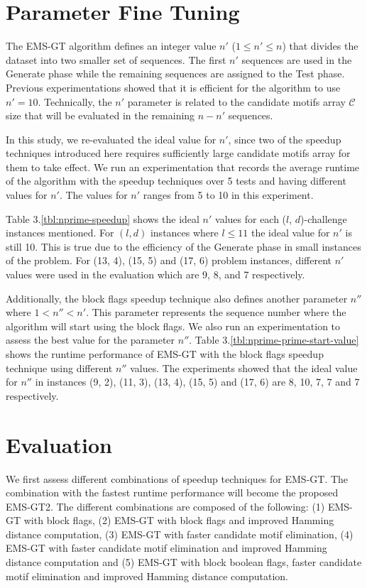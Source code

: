 
\section{Parameter Fine Tuning}
The EMS-GT algorithm defines an integer value $n'$ ($1 \leq n' \leq n$) that divides the dataset into two smaller set of sequences. The first $n'$ sequences are used in the Generate phase while the remaining sequences are assigned to the Test phase. Previous experimentations \cite{sia2015} showed that it is efficient for the algorithm to use $n' = 10$. Technically, the $n'$ parameter is related to the candidate motifs array $\mathcal{C}$ size that will be evaluated in the remaining $n - n'$ sequences.

In this study, we re-evaluated the ideal value for $n'$, since two of the speedup techniques introduced here requires sufficiently large candidate motifs array for them to take effect. We run an experimentation that records the average runtime of the algorithm with the speedup techniques over 5 tests and having different values for $n'$. The values for $n'$ ranges from 5 to 10 in this experiment.

Table 3.\ref{tbl:nprime-speedup} shows the ideal $n'$ values for each ($l$, $d$)-challenge instances mentioned. For $(l, d)$ instances where $l \leq 11$ the ideal value for $n'$ is still 10. This is true due to the efficiency of the Generate phase in small instances of the problem. For (13, 4), (15, 5) and (17, 6) problem instances, different $n'$ values were used in the evaluation which are 9, 8, and 7 respectively.



Additionally, the block flags speedup technique also defines another parameter $n''$ where $1 < n'' < n'$. This parameter represents the sequence number where the algorithm will start using the block flags. We also run an experimentation to assess the best value for the parameter $n''$. Table 3.\ref{tbl:nprime-prime-start-value} shows the runtime performance of EMS-GT with the block flags speedup technique using different $n''$ values. The experiments showed that the ideal value for $n''$ in instances (9, 2), (11, 3), (13, 4), (15, 5) and (17, 6) are 8, 10, 7, 7 and 7 respectively.



\section{Evaluation}
We first assess different combinations of speedup techniques for EMS-GT. The combination with the fastest runtime performance will become the proposed EMS-GT2. The different combinations are composed of the following: (1) EMS-GT with block flags, (2) EMS-GT with block flags and improved Hamming distance computation, (3) EMS-GT with faster candidate motif elimination, (4) EMS-GT with faster candidate motif elimination and improved Hamming distance computation and (5) EMS-GT with block boolean flags, faster candidate motif elimination and improved Hamming distance computation. 

